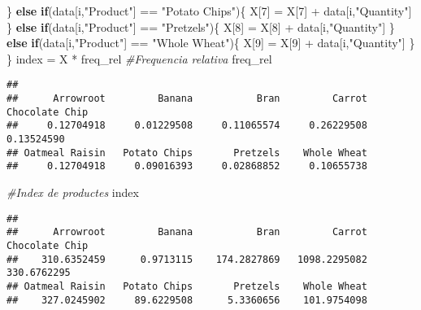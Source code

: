 \documentclass[
]{article}
\newenvironment{Shaded}{\begin{snugshade}}{\end{snugshade}}
\newcommand{\CommentTok}[1]{\textcolor[rgb]{0.56,0.35,0.01}{\textit{#1}}}
\newcommand{\ControlFlowTok}[1]{\textcolor[rgb]{0.13,0.29,0.53}{\textbf{#1}}}
\newcommand{\DecValTok}[1]{\textcolor[rgb]{0.00,0.00,0.81}{#1}}
\newcommand{\NormalTok}[1]{#1}
\newcommand{\OtherTok}[1]{\textcolor[rgb]{0.56,0.35,0.01}{#1}}
\newcommand{\SpecialCharTok}[1]{\textcolor[rgb]{0.00,0.00,0.00}{#1}}
\newcommand{\StringTok}[1]{\textcolor[rgb]{0.31,0.60,0.02}{#1}}
\begin{document}
\begin{Shaded}
\begin{Highlighting}[]
\NormalTok{  \}}
  \ControlFlowTok{else} \ControlFlowTok{if}\NormalTok{(data[i,}\StringTok{"Product"}\NormalTok{] }\SpecialCharTok{==} \StringTok{"Potato Chips"}\NormalTok{)\{}
\NormalTok{    X[}\DecValTok{7}\NormalTok{] }\OtherTok{=}\NormalTok{ X[}\DecValTok{7}\NormalTok{] }\SpecialCharTok{+}\NormalTok{ data[i,}\StringTok{"Quantity"}\NormalTok{]}
\NormalTok{  \}}
  \ControlFlowTok{else} \ControlFlowTok{if}\NormalTok{(data[i,}\StringTok{"Product"}\NormalTok{] }\SpecialCharTok{==} \StringTok{"Pretzels"}\NormalTok{)\{}
\NormalTok{    X[}\DecValTok{8}\NormalTok{] }\OtherTok{=}\NormalTok{ X[}\DecValTok{8}\NormalTok{] }\SpecialCharTok{+}\NormalTok{ data[i,}\StringTok{"Quantity"}\NormalTok{]}
\NormalTok{  \}}
  \ControlFlowTok{else} \ControlFlowTok{if}\NormalTok{(data[i,}\StringTok{"Product"}\NormalTok{] }\SpecialCharTok{==} \StringTok{"Whole Wheat"}\NormalTok{)\{}
\NormalTok{    X[}\DecValTok{9}\NormalTok{] }\OtherTok{=}\NormalTok{ X[}\DecValTok{9}\NormalTok{] }\SpecialCharTok{+}\NormalTok{ data[i,}\StringTok{"Quantity"}\NormalTok{]}
\NormalTok{  \}}
\NormalTok{\}}
\NormalTok{index }\OtherTok{=}\NormalTok{ X }\SpecialCharTok{*}\NormalTok{ freq\_rel}
\CommentTok{\#Frequencia relativa}
\NormalTok{freq\_rel}
\end{Highlighting}
\end{Shaded}

\begin{verbatim}
## 
##      Arrowroot         Banana           Bran         Carrot Chocolate Chip 
##     0.12704918     0.01229508     0.11065574     0.26229508     0.13524590 
## Oatmeal Raisin   Potato Chips       Pretzels    Whole Wheat 
##     0.12704918     0.09016393     0.02868852     0.10655738
\end{verbatim}

\begin{Shaded}
\begin{Highlighting}[]
\CommentTok{\#Index de productes}
\NormalTok{index}
\end{Highlighting}
\end{Shaded}

\begin{verbatim}
## 
##      Arrowroot         Banana           Bran         Carrot Chocolate Chip 
##    310.6352459      0.9713115    174.2827869   1098.2295082    330.6762295 
## Oatmeal Raisin   Potato Chips       Pretzels    Whole Wheat 
##    327.0245902     89.6229508      5.3360656    101.9754098
\end{verbatim}
\end{document}
